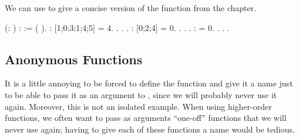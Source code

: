 \documentclass[12pt]{report}
\begin{document}
\subsubsection{ }



 We can use  to give a concise version of the
     function from the  chapter. \begin{coqdoccode}
\coqdocemptyline
\coqdocnoindent
{}  (: ) :  :=\coqdoceol
\coqdocindent{1.00em}
 (  ).\coqdoceol
\coqdocemptyline
\coqdocnoindent
{} :    [1;0;3;1;4;5] = 4.\coqdoceol
\coqdocnoindent
{}. . .\coqdoceol
\coqdocnoindent
{} :    [0;2;4] = 0.\coqdoceol
\coqdocnoindent
{}. . .\coqdoceol
\coqdocnoindent
{} :     = 0.\coqdoceol
\coqdocnoindent
{}. . .\coqdoceol
\coqdocemptyline
\end{coqdoccode}
\subsection{Anonymous Functions}



 It is a little annoying to be forced to define the function
     and give it a name just to be able to pass it as an
    argument to , since we will probably never use it again.
    Moreover, this is not an isolated example.  When using
    higher-order functions, we often want to pass as arguments
    ``one-off'' functions that we will never use again; having to give
    each of these functions a name would be tedious.
\end{document}

